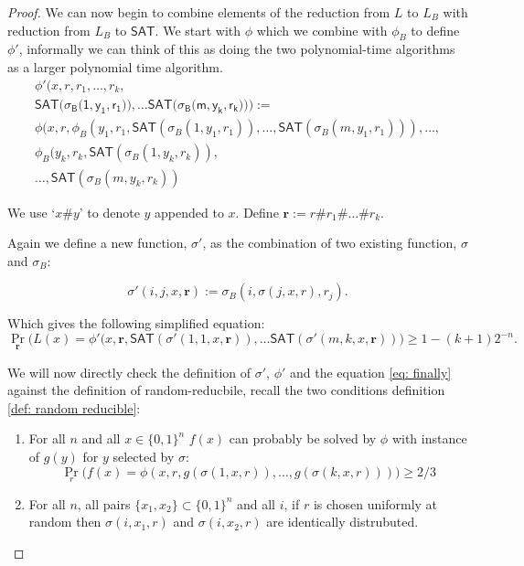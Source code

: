 \documentclass[10pt,a4paper]{article}
\begin{document}
\begin{proof}
We can now begin to combine elements of the reduction from $L$ to $L_B$ with reduction from $L_B$ to $\mathsf{SAT}$. We start with $\phi$ which we combine with $\phi_B$ to define $\phi'$, informally we can think of this as doing the two polynomial-time algorithms as a larger polynomial time algorithm.
\begin{multline*}
\phi'(x,r,r_1,\ldots,r_k,\\
\mathsf{SAT(\sigma_B(1,y_1,r_1})),\ldots \mathsf{SAT(\sigma_B(m,y_k,r_k}))):=
\\
\phi(x,r,\phi_{B}(y_1,r_1,\mathsf{SAT}(\sigma_{B}(1,y_1,r_1)),
\ldots, \mathsf{SAT}(\sigma_{B}(m, y_1, r_1))),\ldots,\\
\phi_{B}(y_k,r_k,\mathsf{SAT}(\sigma_{B}(1,y_k,r_k)),\\
\ldots, \mathsf{SAT}(\sigma_{B}(m,y_k,r_k))
\end{multline*}

We use `$x\#y$' to denote $y$ appended to $x$. Define $\mathbf{r}:=r\#r_1\#\ldots\#r_k$.

Again we define a new function, $\sigma'$, as the combination of two existing function, $\sigma$ and $\sigma_B$:

\[
\sigma'(i,j,x,\mathbf{r}):= \sigma_B(i,\sigma(j,x,r),r_j).
\]

Which gives the following simplified equation:
\begin{equation}\label{eq: finally}
\Pr_{\mathbf{r}}\big(
            L(x)=
\phi'(x,\mathbf{r}, \mathsf{SAT}(\sigma'(1,1,x,\mathbf{r})),\ldots \mathsf{SAT}(\sigma'(m,k,x,\mathbf{r}))
            \big)
            \geq 1-(k+1)2^{-n}.
\end{equation}

We will now directly check the definition of $\sigma'$, $\phi'$ and the equation \ref{eq: finally} against the definition of random-reducbile, recall the two conditions definition \ref{def: random reducible}:
\begin{enumerate}[label={(\arabic*)}]
        \item For all $n$ and all $x \in \{0,1\}^n$ $f(x)$ can probably be solved by $\phi$ with instance of $g(y)$ for $y$ selected by $\sigma$:
            \[
            \Pr_{r}\big(
            f(x)=\phi(x,r,g(\sigma(1,x,r)),\ldots, g(\sigma(k, x, r)))
            \big)\geq2/3
            \]
        \item For all $n$, all pairs $\{x_1,x_2\}\subset \{0,1\}^n$ and all $i$, if $r$ is chosen uniformly at random then $\sigma(i,x_1,r)$ and $\sigma(i,x_2,r)$ are identically distrubuted.
    \end{enumerate}


\end{proof}
\end{document}
